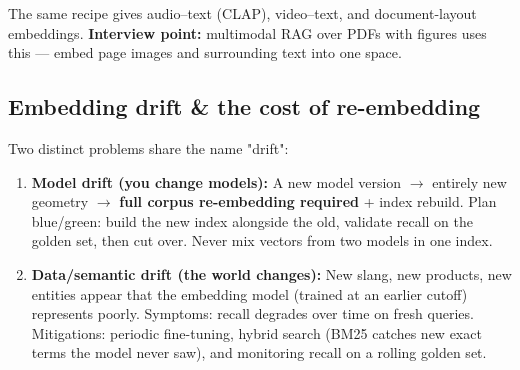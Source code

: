\documentclass[11pt]{article}
\begin{document}
The same recipe gives audio--text (CLAP), video--text, and document-layout embeddings. \textbf{Interview point:} multimodal RAG over PDFs with figures uses this --- embed page images and surrounding text into one space.

\subsection{Embedding drift \& the cost of re-embedding}\label{embedding-drift--the-cost-of-re-embedding}

Two distinct problems share the name "drift":

\begin{enumerate}
\def\labelenumi{\arabic{enumi}.}
\item
  \textbf{Model drift (you change models):} A new model version \(\rightarrow\) entirely new geometry \(\rightarrow\) \textbf{full corpus re-embedding required} + index rebuild. Plan blue/green: build the new index alongside the old, validate recall on the golden set, then cut over. Never mix vectors from two models in one index.
\item
  \textbf{Data/semantic drift (the world changes):} New slang, new products, new entities appear that the embedding model (trained at an earlier cutoff) represents poorly. Symptoms: recall degrades over time on fresh queries. Mitigations: periodic fine-tuning, hybrid search (BM25 catches new exact terms the model never saw), and monitoring recall on a rolling golden set.
\end{enumerate}

\end{document}
